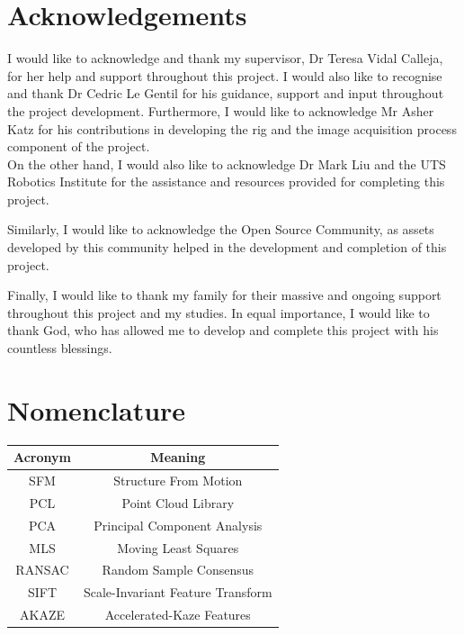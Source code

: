 \documentclass[12pt]{report}
\begin{document}
\enlargethispage{\baselineskip}
\chapter*{Acknowledgements}
I would like to acknowledge and thank my supervisor, Dr Teresa Vidal Calleja, for her help and support throughout this project. I would also like to recognise and thank Dr Cedric Le Gentil for his guidance, support and input throughout the project development.
Furthermore, I would like to acknowledge Mr Asher Katz for his contributions in developing the rig and the image acquisition process component of the project.\\
On the other hand, I would also like to acknowledge Dr Mark Liu and the UTS Robotics Institute for the assistance and resources provided for completing this project.

Similarly, I would like to acknowledge the Open Source Community, as assets developed by this community helped in the development and completion of this project.

Finally, I would like to thank my family for their massive and ongoing support throughout this project and my studies. In equal importance, I would like to thank God, who has allowed me to develop and complete this project with his countless blessings.







\tableofcontents
\listoffigures
\listoftables

\chapter*{Nomenclature}

\begin{table}[H]
  \centering
  \begin{tabular}{|c|c|}
  \hline
  \textbf{Acronym} & \textbf{Meaning}                  \\ \hline
  SFM              & Structure From Motion             \\ \hline
  PCL              & Point Cloud Library               \\ \hline
  PCA              & Principal Component Analysis      \\ \hline
  MLS              & Moving Least Squares              \\ \hline
  RANSAC           & Random Sample Consensus           \\ \hline
  SIFT             & Scale-Invariant Feature Transform \\ \hline
  AKAZE            & Accelerated-Kaze Features         \\ \hline
  \end{tabular}
  \end{table}
\end{document}
